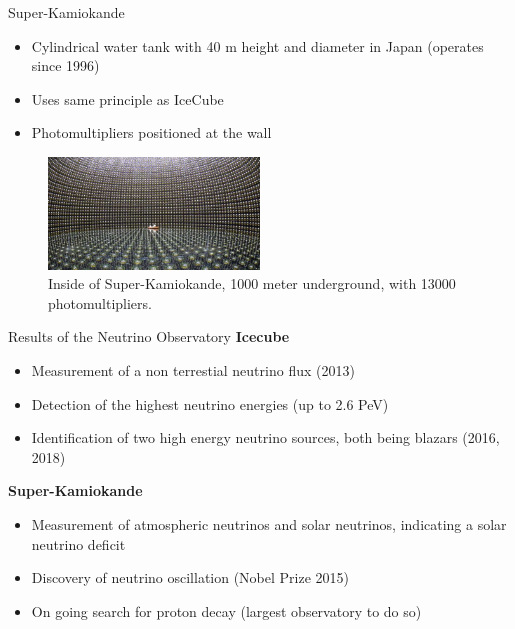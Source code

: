 \documentclass[aspectratio=1610, 10pt]{beamer}
\begin{document}
\begin{frame}{Super-Kamiokande}
  \begin{itemize}
    \item Cylindrical water tank with 40 m height and diameter in Japan (operates since 1996)
    \medskip
    \item Uses same principle as IceCube
    \medskip
    \item Photomultipliers positioned at the wall
  \end{itemize}
  \begin{figure}
    \includegraphics[width=0.5\textwidth]{images/kamiokande.png}
    \caption{Inside of Super-Kamiokande, 1000 meter underground, with 13000 photomultipliers.}
  \end{figure}
\end{frame}

\begin{frame}{Results of the Neutrino Observatory}
\textbf{Icecube}
 \begin{itemize}
   \item Measurement of a non terrestial neutrino flux (2013)
   \medskip
   \item Detection of the highest neutrino energies (up to 2.6 PeV)
   \medskip
   \item Identification of two high energy neutrino sources, both being blazars (2016, 2018)
 \end{itemize}
\vspace{0.5cm}
\textbf{Super-Kamiokande}
  \begin{itemize}
    \item Measurement of atmospheric neutrinos and solar neutrinos, indicating a solar neutrino deficit
    \medskip
    \item Discovery of neutrino oscillation (Nobel Prize 2015)
    \medskip
    \item On going search for proton decay (largest observatory to do so)
  \end{itemize}
\end{frame}
\end{document}

